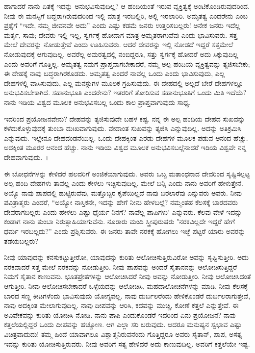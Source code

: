 ಹಾಗಾದರೆ ನಾನು ಏತಕ್ಕೆ ಇದನ್ನು ಅನುಭವಿಸುವುದಿಲ್ಲ? ಆ ಹಂದಿಯಂತೆ ಇರುವ ವ್ಯಕ್ತಿತ್ವಕ್ಕೆ ಅಂಟಿಕೊಂಡಿರುವುದರಿಂದ. ನೀವು ಈ ಮನಸ್ಸಿಗೆ ಬದ್ದರಾಗಿರುವುದರಿಂದ ಇಲ್ಲಿ ಮಾತ್ರ ಇರಬಲ್ಲಿರಿ, ಅಲ್ಲಿ ಇರಲಾರಿರಿ. ಅಮೃತತ್ವ ಎಂದರೇನು ಎಂಬ ಪ್ರಶ್ನೆಗೆ “ಇದೇ, ನಮ್ಮ ಜೀವನವೇ ಅದು'' ಎಂದು ಎಷ್ಟು ಕಡಮೆ ಜನರು ಉತ್ತರಿಸಬಲ್ಲರು! ಅನೇಕ ಜನರು ಇದೆಲ್ಲ ಮರ್ತ್ಯ, ಸಾವು; ದೇವರು ಇಲ್ಲಿ ಇಲ್ಲ, ಸ್ವರ್ಗಕ್ಕೆ ಹೋದಾಗ ಮಾತ್ರ ಅಮೃತರಾಗುವೆವು ಎಂದು ಭಾವಿಸುವರು. ಸತ್ತ ಮೇಲೆ ದೇವರನ್ನು ನೋಡುತ್ತೇವೆ ಎಂದು ಊಹಿಸುವರು. ಆದರೆ ದೇವರನ್ನು ಇಲ್ಲಿ ನೋಡದೆ ಇದ್ದರೆ ಸತ್ತಮೇಲೆ ನೋಡುವುದಕ್ಕೆ ಆಗುವುದಿಲ್ಲ. ಅವರೆಲ್ಲ ಅಮರತ್ವದಲ್ಲಿ ನಂಬಿದ್ದರೂ, ಸತ್ತು ಸ್ವರ್ಗಕ್ಕೆ ಹೋದರೆ ಅದು ಸಿಕ್ಕುವುದಿಲ್ಲ ಎಂದು ಅವರಿಗೆ ಗೊತ್ತಿಲ್ಲ. ಅಮೃತತ್ವ ನಮಗೆ ಪ್ರಾಪ್ತವಾಗಬೇಕಾದರೆ, ನಮ್ಮ ಅಲ್ಪ ಹಂದಿಯ ವ್ಯಕ್ತಿತ್ವವನ್ನು ತ್ಯಜಿಸಬೇಕು; ಈ ದೇಹಕ್ಕೆ ನಾವು ಬದ್ಧರಾಗಿರಕೂಡದು. ಅಮೃತತ್ವ ಎಂದರೆ ನಾವೆಲ್ಲ ಒಂದು ಎಂದು ಭಾವಿಸುವುದು, ಎಲ್ಲ ದೇಹಗಳಲ್ಲಿ ವಾಸಿಸುವುದು, ಎಲ್ಲ ಮನಸ್ಸುಗಳ ಮೂಲಕ ಗ್ರಹಿಸುವುದು. ಈ ದೇಹದಲ್ಲಿ ಅಲ್ಲದೆ ಬೇರೆ ದೇಹಗಳಲ್ಲೂ ಅನುಭವಿಸಬೇಕಾಗಿದೆ. ಸಹಾನುಭೂತಿ ಎಂದರೇನು? ಇತರರಿಗೆ ತೋರಿಸುವ ಸಹಾನುಭೂತಿಗೆ ಒಂದು ಮಿತಿ ಇದೆಯೆ? ನಾನು ಇಡಿಯ ವಿಶ್ವದ ಮೂಲಕ ಅನುಭವಿಸಬಲ್ಲ ಒಂದು ಕಾಲ ಪ್ರಾಪ್ತವಾಗುವುದು ಸಾಧ್ಯ.

ಇದರಿಂದ ಪ್ರಯೋಜನವೇನು? ದೇಹವನ್ನು ತ್ಯಜಿಸುವುದೇ ಬಹಳ ಕಷ್ಟ. ನನ್ನ ಈ ಅಲ್ಪ ಹಂದಿಯ ದೇಹದ ಸುಖವನ್ನು ಕಳೆದುಕೊಳ್ಳುವುದಕ್ಕೆ ತುಂಬಾ ದುಃಖವಾಗುವುದು. ವೇದಾಂತ ಸುಖವನ್ನು ತ್ಯಜಿಸಿ ಎನ್ನುವುದಿಲ್ಲ. ಅದನ್ನು ಅತಿಕ್ರಮಿಸಿ ಎನ್ನುವುದು. ಇಲ್ಲೇನೂ ದೇಹದಂಡನೆಯಿಲ್ಲ. ಒಂದು ದೇಹಕ್ಕಿಂತ ಎರಡು ದೇಹಗಳ ಮೂಲಕ ಪಡುವ ಆನಂದ ಹೆಚ್ಚು. ಅದಕ್ಕಿಂತ ಮೂರರ ಆನಂದ ಹೆಚ್ಚು. ನಾನು ಇಡಿಯ ವಿಶ್ವದ ಮೂಲಕ ಅನುಭವಿಸಬಲ್ಲೆನಾದರೆ ಇಡಿಯ ವಿಶ್ವವೇ ನನ್ನ ದೇಹವಾಗುವುದು.~।

ಈ ಬೋಧನೆಗಳನ್ನು ಕೇಳಿದರೆ ಹಲವರಿಗೆ ಅಂಜಿಕೆಯಾಗುವುದು. ಅವರು ಒಬ್ಬ ಮತಾಂಧನಾದ ದೇವರಿಂದ ಸೃಷ್ಟಿಸಲ್ಪಟ್ಟ ಅಲ್ಪ ಹಂದಿ ದೇಹಗಳು ತಾವಲ್ಲ ಎಂದು ಕೇಳಲು ಇಚ್ಛಿಸುವುದಿಲ್ಲ. ಮೇಲೆ ಬನ್ನಿ ಎಂದು ನಾನು ಅವರಿಗೆ ಹೇಳುತ್ತೇನೆ. ಅಯ್ಯೊ ನಾವು ಪಾಪದಲ್ಲಿ ಹುಟ್ಟಿರುವೆವು, ಮತ್ತೊಬ್ಬರ ಕೃಪೆಯಿಲ್ಲದೆ ನಾವು ಬರಲಾರೆವು ಎನ್ನುವರು ಅವರು. ನೀವು ಪವಿತ್ರಾತ್ಮರು ಎಂದರೆ, “ಅಯ್ಯೋ ನಾಸ್ತಿಕನೇ, ಇದನ್ನು ಹೇಗೆ ನೀನು ಹೇಳಬಲ್ಲೆ? ನಮ್ಮಂತಹ ಕೆಲಸಕ್ಕೆ ಬಾರದವರು ದೇವರಾಗಬಲ್ಲರು ಎಂದು ಹೇಳಲು ಎಷ್ಟು ಧೈರ್ಯ ನಿನಗೆ? ನಾವೆಲ್ಲ ಪಾಪಿಗಳು' ಎನ್ನುವರು. ಕೆಲವು ವೇಳೆ ಇದನ್ನು ಕಂಡಾಗ ನಾನು ತುಂಬಾ ನಿರುತ್ಸಾಹಿಯಾಗುವೆನು. ನೂರಾರು ಮಂದಿ ಸ್ತ್ರೀಪುರುಷರು "ನರಕವಿಲ್ಲದೇ ಇದ್ದರೆ ಹೇಗೆ ಧರ್ಮ ಇರಬಲ್ಲದು?'' ಎಂದು ಪ್ರಶ್ನಿಸುವರು. ಈ ಜನರು ತಾವೇ ನರಕಕ್ಕೆ ಹೋಗಲು ಇಚ್ಛೆ ಪಟ್ಟರೆ ಯಾರು ಅವರನ್ನು ತಡೆಯಬಲ್ಲರು?

ನೀವು ಯಾವುದನ್ನು ಕನಸುಕಟ್ಟುತ್ತೀರೋ, ಯಾವುದನ್ನು ಕುರಿತು ಆಲೋಚಿಸುತ್ತಿರುವಿರೋ ಅವನ್ನು ಸೃಷ್ಟಿಸುತ್ತೀರಿ. ಅದು ನರಕವಾದರೆ ಸತ್ತ ಮೇಲೆ ನರಕವನ್ನು ನೋಡುತ್ತೀರಿ. ನೀವು ಪಾಪವನ್ನು ಅಂದರೆ ಸೈತಾನನನ್ನು ಆಲೋಚಿಸುತ್ತಿದ್ದರೆ ನಿಮಗೆ ಸೈತಾನ ಕಾಣುವನು. ಭೂತಪ್ರೇತಗಳನ್ನು ಆಲೋಚಿಸಿದರೆ ನೀವು ಅವನ್ನು ನೋಡುತ್ತೀರಿ. ನೀವು ಆಲೋಚಿಸಿದಂತೆ ಆಗುತ್ತೀರಿ. ನೀವು ಆಲೋಚಿಸಬೇಕಾದರೆ ಒಳ್ಳೆಯದನ್ನು ಆಲೋಚಿಸಿ, ಮಹದಾಲೋಚನೆಗಳನ್ನು ಮಾಡಿ. ನೀವು ಕೆಲಸಕ್ಕೆ ಬಾರದ ಸಣ್ಣ ಕೀಟಗಳೆಂದು ಭಾವಿಸುವುದು ಯೋಗ್ಯವಲ್ಲ. ನಾವು ದುರ್ಬಲರೆಂದು ಹೇಳಿಕೊಂಡರೆ ದುರ್ಬಲರಾಗುತ್ತೇವೆ, ನಾವು ಅದಕ್ಕಿಂತ ಮೇಲಾಗುವುದಿಲ್ಲ. ನಾವು ದೀಪವನ್ನು ಆರಿಸಿ, ಕದವನ್ನು ಮುಚ್ಚಿ, ಕೋಣೆ ಕತ್ತಲೆ ಎನ್ನುತ್ತೇವೆ. ಈ ಅವಿವೇಕವನ್ನು ಕುರಿತು ಯೋಚಿಸಿ ನೋಡಿ. ನಾನು ಪಾಪಿ ಎಂದುಕೊಂಡರೆ ಇದರಿಂದ ಏನು ಪ್ರಯೋಜನ? ನಾವು ಕತ್ತಲೆಯಲ್ಲಿದ್ದರೆ ಒಂದು ದೀಪವನ್ನು ಹಚ್ಚೋಣ. ಆಗ ಎಲ್ಲಾ ಸರಿ ಬರುವುದು. ಆದರೂ ಮನುಷ್ಯನ ಸ್ವಭಾವ ಎಷ್ಟು ವಿಚಿತ್ರವಾದುದು! ತಮ್ಮ ಹಿಂದೆ ಯಾವಾಗಲೂ ವಿಶ್ವಾತ್ಮನಿರುವನೆಂದು ಗೊತ್ತಿದ್ದರೂ ಅವರು ಸೈತಾನ್, ಪಾಪ, ಅಸತ್ಯ ಇವನ್ನು ಕುರಿತು ಯೋಚಿಸುತ್ತಿರುವರು. ನೀವು ಅವರಿಗೆ ಸತ್ಯ ಹೇಳಿದರೆ ಅದು ಕಾಣುವುದಿಲ್ಲ. ಅವರಿಗೆ ಕತ್ತಲೆಯೇ ಇಷ್ಟ.

